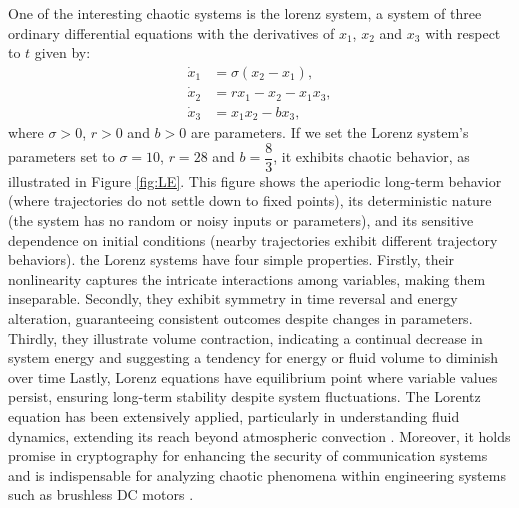 \documentclass[11pt]{article}
\theoremstyle{definition}
\begin{document}
One of the interesting chaotic systems \cite{noauthor_lorenz_nodate} is the lorenz system, a system of three ordinary differential equations with the derivatives of $x_1$, $x_2$ and $x_3$ with respect to $t$ given by:
\begin{align*}
\dot{x}_1 &= \sigma(x_2 - x_1), \\
\dot{x}_2 &= rx_1 - x_2 - x_1x_3, \\
\dot{x}_3 &= x_1x_2 - bx_3,
\end{align*}
where $\sigma > 0$, $r > 0$ and $b > 0$ are parameters. If we set the Lorenz system's parameters set to $\sigma = 10$, $r = 28$ and $b = \dfrac{8}{3}$, it exhibits chaotic behavior, as illustrated in Figure \ref{fig:LE}. This figure shows the aperiodic long-term behavior (where trajectories do not settle down to fixed points), its deterministic nature (the system has no random or noisy inputs or parameters), and its sensitive dependence on initial conditions (nearby trajectories exhibit different trajectory behaviors). the Lorenz systems have four simple properties. Firstly, their nonlinearity captures the intricate interactions among variables, making them inseparable. Secondly, they exhibit symmetry in time reversal and energy alteration, guaranteeing consistent outcomes despite changes in parameters. Thirdly, they illustrate volume contraction, indicating a continual decrease in system energy and suggesting a tendency for energy or fluid volume to diminish over time Lastly, Lorenz equations have equilibrium point where variable values persist, ensuring long-term stability despite system fluctuations. The Lorentz equation has been extensively applied, particularly in understanding fluid dynamics, extending its reach beyond atmospheric convection \cite{bond_compact_2010, elhadj_models_2011}. Moreover, it holds promise in cryptography for enhancing the security of communication systems \cite{orue_lorenz_2006} and is indispensable for analyzing chaotic phenomena within engineering systems such as brushless DC motors \cite{qi_energy_2017}.
\end{document}
